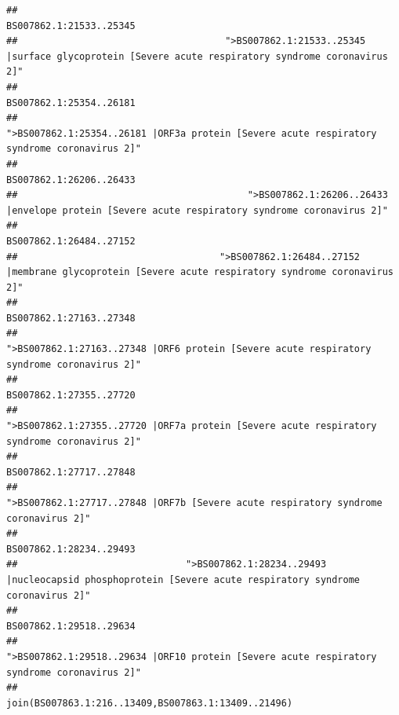 \documentclass[
]{article}
\begin{document}
\begin{verbatim}
##                                                                                                                BS007862.1:21533..25345 
##                                     ">BS007862.1:21533..25345 |surface glycoprotein [Severe acute respiratory syndrome coronavirus 2]" 
##                                                                                                                BS007862.1:25354..26181 
##                                            ">BS007862.1:25354..26181 |ORF3a protein [Severe acute respiratory syndrome coronavirus 2]" 
##                                                                                                                BS007862.1:26206..26433 
##                                         ">BS007862.1:26206..26433 |envelope protein [Severe acute respiratory syndrome coronavirus 2]" 
##                                                                                                                BS007862.1:26484..27152 
##                                    ">BS007862.1:26484..27152 |membrane glycoprotein [Severe acute respiratory syndrome coronavirus 2]" 
##                                                                                                                BS007862.1:27163..27348 
##                                             ">BS007862.1:27163..27348 |ORF6 protein [Severe acute respiratory syndrome coronavirus 2]" 
##                                                                                                                BS007862.1:27355..27720 
##                                            ">BS007862.1:27355..27720 |ORF7a protein [Severe acute respiratory syndrome coronavirus 2]" 
##                                                                                                                BS007862.1:27717..27848 
##                                                    ">BS007862.1:27717..27848 |ORF7b [Severe acute respiratory syndrome coronavirus 2]" 
##                                                                                                                BS007862.1:28234..29493 
##                              ">BS007862.1:28234..29493 |nucleocapsid phosphoprotein [Severe acute respiratory syndrome coronavirus 2]" 
##                                                                                                                BS007862.1:29518..29634 
##                                            ">BS007862.1:29518..29634 |ORF10 protein [Severe acute respiratory syndrome coronavirus 2]" 
##                                                                                    join(BS007863.1:216..13409,BS007863.1:13409..21496) 

\end{verbatim}
\end{document}
